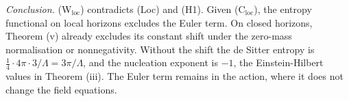 \emph{Conclusion.} (W$_{\mathrm{loc}}$) contradicts (Loc) and (H1). Given (C$_{\mathrm{loc}}$), the entropy functional on local horizons excludes the Euler term. On closed horizons, Theorem (v) already excludes its constant shift under the zero-mass normalisation or nonnegativity. Without the shift the de Sitter entropy is $\tfrac14\cdot 4\pi\cdot 3/\Lambda = 3\pi/\Lambda$, and the nucleation exponent is $-1$, the Einstein-Hilbert values in Theorem (iii). The Euler term remains in the action, where it does not change the field equations.

